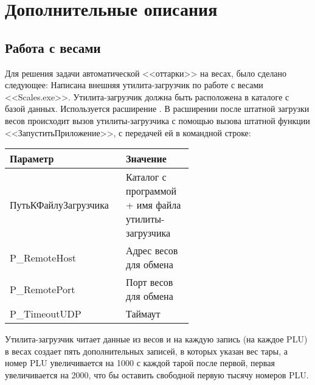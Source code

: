 \section{Дополнительные описания}

\subsection{Работа с весами}\label{1001}

Для решения задачи автоматической <<оттарки>> на весах, было сделано следующее:
Написана внешняя утилита-загрузчик по работе с весами <<Scales.exe>>. Утилита-загрузчик должна быть расположена в каталоге с базой данных.
Используется расширение .
В расширении после штатной загрузки весов происходит вызов  утилиты-загрузчика с помощью вызова штатной функции <<ЗапуститьПриложение>>, с передачей ей в командной строке:
\vspace{\baselineskip}

\begin{tabular}{p{0.3\linewidth}p{0.3\linewidth}}
	\toprule   
	Параметр & Значение \\
	\midrule
	ПутьКФайлуЗагрузчика & Каталог с программой + имя файла утилиты-загрузчика \\
	 P\_RemoteHost & Адрес весов для обмена \\
	 P\_RemotePort  & Порт весов для обмена \\
	 P\_TimeoutUDP  & Таймаут \\
	\bottomrule %
\end{tabular}


\vspace{\baselineskip}

Утилита-загрузчик читает данные из весов и на каждую запись (на каждое PLU) в весах создает пять дополнительных записей, в которых указан вес тары, а номер PLU увеличивается на 1000 с каждой тарой после первой, первая увеличивается на 2000, что бы оставить свободной первую тысячу номеров PLU. 

